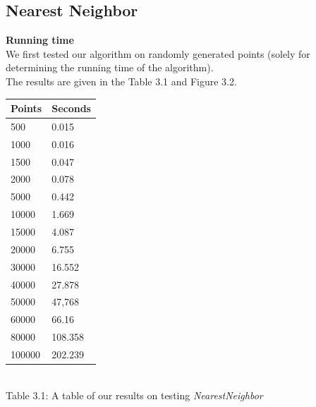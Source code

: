 \subsection{Nearest Neighbor}
  \label{sub:nn_test_results}
    \textbf{Running time}\\
    We first tested our algorithm on randomly generated points (solely for determining the running time of the algorithm).\\
    The results are given in the Table 3.1 and Figure 3.2.

      \begin{center}
        \begin{tabular}{|p{2.5cm}|p{2.5cm}|}
            \hline
            Points & Seconds\\
            \hline
            \hline
            500 & 0.015\\
            \hline
            1000 & 0.016\\
            \hline
            1500 & 0.047\\
            \hline
            2000 & 0.078\\
            \hline
            5000 & 0.442\\
            \hline
            10000 & 1.669\\
            \hline
            15000 & 4.087\\
            \hline
            20000 & 6.755\\
            \hline
            30000 & 16.552\\
            \hline
            40000 & 27.878\\
            \hline
            50000 & 47,768\\
            \hline
            60000 & 66.16\\
            \hline
            80000 & 108.358\\
            \hline
            100000 & 202.239\\
            \hline
        \end{tabular}
        \label{tab:nn_runningtime}\\
        Table 3.1: A table of our results on testing \textit{NearestNeighbor}
    \end{center}

